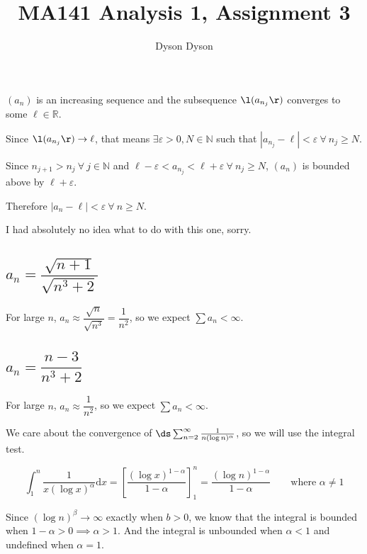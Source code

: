 \documentclass[a4paper]{article}
\title{MA141 Analysis 1, Assignment 3}
\author{Dyson Dyson}
\date{}
\begin{document}
\maketitle

\setlength{\parindent}{0em}
\setlength{\parskip}{1em}



$(a_n)$ is an increasing sequence and the subsequence $\l(a_{n_j}\r)$ converges to some $\ell \in \mathbb R$.

Since $\l(a_{n_j}\r) \to \ell$, that means $\exists \varepsilon > 0, N \in \mathbb N$ such that $|a_{n_j} - \ell| < \varepsilon\ \forall\ n_j \ge N$.

Since $n_{j+1} > n_j\ \forall\ j \in \mathbb N$ and $\ell - \varepsilon < a_{n_j} < \ell + \varepsilon\ \forall\ n_j \ge N$, $(a_n)$ is bounded above by $\ell + \varepsilon$.

Therefore $|a_n - \ell| < \varepsilon\ \forall\ n \ge N$.



I had absolutely no idea what to do with this one, sorry.

\subsection{$a_n = \dfrac{\sqrt{n + 1}}{\sqrt{n^3 + 2}}$}

For large $n$, $a_n \approx \dfrac{\sqrt n}{\sqrt{n^3}} = \dfrac{1}{n^2}$, so we expect $\sum a_n < \infty$.

\subsection{$a_n = \dfrac{n - 3}{n^3 + 2}$}

For large $n$, $a_n \approx \dfrac{1}{n^2}$, so we expect $\sum a_n < \infty$.



We care about the convergence of $\ds\sum_{n=2}^\infty \frac1{n (\log n)^\alpha}$, so we will use the integral test.

$$\int_1^n \frac1{x (\log x)^\alpha} \mathrm d x = \left[ \frac{(\log x)^{1 - \alpha}}{1 - \alpha} \right]_1^n =  \frac{(\log n)^{1 - \alpha}}{1 - \alpha} \qquad \text{where } \alpha \ne 1$$

Since $(\log n)^\beta \to \infty$ exactly when $b > 0$, we know that the integral is bounded when $1 - \alpha > 0 \implies \alpha > 1$. And the integral is unbounded when $\alpha < 1$ and undefined when $\alpha = 1$.
\end{document}

